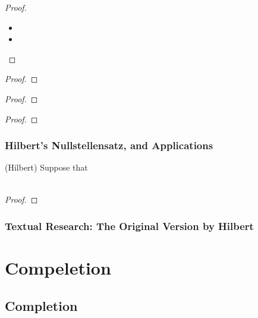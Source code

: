 \documentclass[Total.tex]{subfiles}
\begin{document}
				\begin{proof}
					\begin{itemize}
						\item 
						\item 
					\end{itemize}
				\end{proof}
				
				\begin{theorem}
				\end{theorem}
				
				\begin{proof}
				\end{proof}
				
				\begin{theorem}
				\end{theorem}
				
				\begin{proof}
				\end{proof}
		
			
				\begin{lemma}
				\end{lemma}
				
				\begin{proof}
				\end{proof}
				
			\subsection{Hilbert's Nullstellensatz, and Applications}
			
				\begin{theorem}
					(Hilbert) Suppose that
					
					\begin{gather*}
					\end{gather*}
 				\end{theorem}
				
				\begin{proof}
				\end{proof}
		
			\subsection{Textual Research: The Original Version by Hilbert}
			
	\chapter{Compeletion}
		\section{Completion}
	
\end{document}
